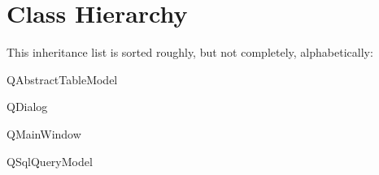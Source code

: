\section{Class Hierarchy}
This inheritance list is sorted roughly, but not completely, alphabetically\+:\begin{DoxyCompactList}
\item Q\+Abstract\+Table\+Model\begin{DoxyCompactList}
\item {}
\end{DoxyCompactList}
\item Q\+Dialog\begin{DoxyCompactList}
\item {}
\end{DoxyCompactList}
\item Q\+Main\+Window\begin{DoxyCompactList}
\item {}
\end{DoxyCompactList}
\item Q\+Sql\+Query\+Model\begin{DoxyCompactList}
\item {}
\end{DoxyCompactList}
\end{DoxyCompactList}
